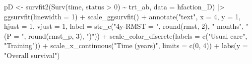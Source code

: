 \documentclass[
  letterpaper,
  DIV=11,
  numbers=noendperiod]{scrreprt}
\newenvironment{Shaded}{\begin{snugshade}}{\end{snugshade}}
\newcommand{\AttributeTok}[1]{\textcolor[rgb]{0.40,0.45,0.13}{#1}}
\newcommand{\DecValTok}[1]{\textcolor[rgb]{0.68,0.00,0.00}{#1}}
\newcommand{\FunctionTok}[1]{\textcolor[rgb]{0.28,0.35,0.67}{#1}}
\newcommand{\NormalTok}[1]{\textcolor[rgb]{0.00,0.23,0.31}{#1}}
\newcommand{\OtherTok}[1]{\textcolor[rgb]{0.00,0.23,0.31}{#1}}
\newcommand{\SpecialCharTok}[1]{\textcolor[rgb]{0.37,0.37,0.37}{#1}}
\newcommand{\StringTok}[1]{\textcolor[rgb]{0.13,0.47,0.30}{#1}}
\begin{document}
\begin{Shaded}
\begin{Highlighting}[]
\NormalTok{pD }\OtherTok{\textless{}{-}} \FunctionTok{survfit2}\NormalTok{(}\FunctionTok{Surv}\NormalTok{(time, status }\SpecialCharTok{\textgreater{}} \DecValTok{0}\NormalTok{) }\SpecialCharTok{\textasciitilde{}}\NormalTok{ trt\_ab, }\AttributeTok{data =}\NormalTok{ hfaction\_D) }\SpecialCharTok{|\textgreater{}}
  \FunctionTok{ggsurvfit}\NormalTok{(}\AttributeTok{linewidth =} \DecValTok{1}\NormalTok{) }\SpecialCharTok{+}
  \FunctionTok{scale\_ggsurvfit}\NormalTok{() }\SpecialCharTok{+}
  \FunctionTok{annotate}\NormalTok{(}\StringTok{"text"}\NormalTok{, }\AttributeTok{x =} \DecValTok{4}\NormalTok{, }\AttributeTok{y =} \DecValTok{1}\NormalTok{, }\AttributeTok{hjust =} \DecValTok{1}\NormalTok{, }\AttributeTok{vjust =} \DecValTok{1}\NormalTok{, }
           \AttributeTok{label =} \FunctionTok{str\_c}\NormalTok{(}\StringTok{"4y{-}RMST = "}\NormalTok{, }\FunctionTok{round}\NormalTok{(rmst, }\DecValTok{2}\NormalTok{), }\StringTok{" months"}\NormalTok{,}
                            \StringTok{" (P = "}\NormalTok{, }\FunctionTok{round}\NormalTok{(rmst\_p, }\DecValTok{3}\NormalTok{), }\StringTok{")"}\NormalTok{)) }\SpecialCharTok{+}
  \FunctionTok{scale\_color\_discrete}\NormalTok{(}\AttributeTok{labels =} \FunctionTok{c}\NormalTok{(}\StringTok{"Usual care"}\NormalTok{, }\StringTok{"Training"}\NormalTok{)) }\SpecialCharTok{+}
  \FunctionTok{scale\_x\_continuous}\NormalTok{(}\StringTok{"Time (years)"}\NormalTok{, }\AttributeTok{limits =} \FunctionTok{c}\NormalTok{(}\DecValTok{0}\NormalTok{, }\DecValTok{4}\NormalTok{)) }\SpecialCharTok{+}
  \FunctionTok{labs}\NormalTok{(}\AttributeTok{y =} \StringTok{"Overall survival"}\NormalTok{)}


\end{Highlighting}
\end{Shaded}
\end{document}
